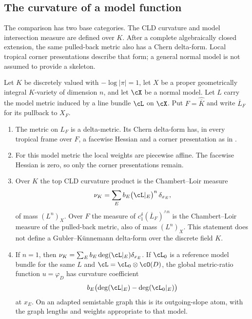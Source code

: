 \subsection{The curvature of a model function}
\label{sec:ch18-model-curvature}

The comparison has two base categories.  The CLD curvature and model
intersection measure are defined over $K$.  After a complete algebraically
closed extension, the same pulled-back metric also has a Chern delta-form.
Local tropical corner presentations describe that form; a general normal
model is not assumed to provide a skeleton.

\begin{theorem}
\label{thm:ch18-model-corner}
Let $K$ be discretely valued with $-\log|\pi|=1$, let $X$ be a proper
geometrically integral $K$-variety of dimension $n$, and let $\cX$ be a
normal model.  Let $L$ carry the model metric induced by a line bundle
$\cL$ on $\cX$.  Put $F=\widehat{\overline K}$ and write
$\overline L_F$ for its pullback to $X_F$.
\begin{enumerate}
\item\label{itm:ch18-mc:delta}
 The metric on $L_F$ is a delta-metric.  Its Chern delta-form has, in every
 tropical frame over $F$, a facewise Hessian and a corner presentation as
 in .
\item\label{itm:ch18-mc:PL}
 For this model metric the local weights are piecewise affine.  The
 facewise Hessian is zero, so only the corner presentations remain.
\item\label{itm:ch18-mc:numbers}
 Over $K$ the top CLD curvature product is the Chambert--Loir measure
 \[
  \nu_K=\sum_E b_E\bigl(\cL|_E\bigr)^n\,\delta_{x_E},
 \]
 of mass $(L^n)_X$.  Over $F$ the measure of
 $c_1^\delta(\overline L_F)^{\wedge n}$ is the Chambert--Loir measure of
 the pulled-back metric, also of mass $(L^n)_X$.  This statement does not
 define a Gubler--K\"unnemann delta-form over the discrete field $K$.
\item\label{itm:ch18-mc:curve}
 If $n=1$, then $\nu_K=\sum_Eb_E\deg(\cL|_E)\delta_{x_E}$.
 If $\cL_0$ is a reference model bundle for the same $L$ and
 $\cL=\cL_0\otimes\cO(D)$, the global metric-ratio function
 $u=\varphi_D$ has curvature coefficient
 \[
  b_E\bigl(\deg(\cL|_E)-\deg(\cL_0|_E)\bigr)
 \]
 at $x_E$.  On an adapted semistable graph this is its outgoing-slope
 atom, with the graph lengths and weights appropriate to that model.
\end{enumerate}
\end{theorem}

